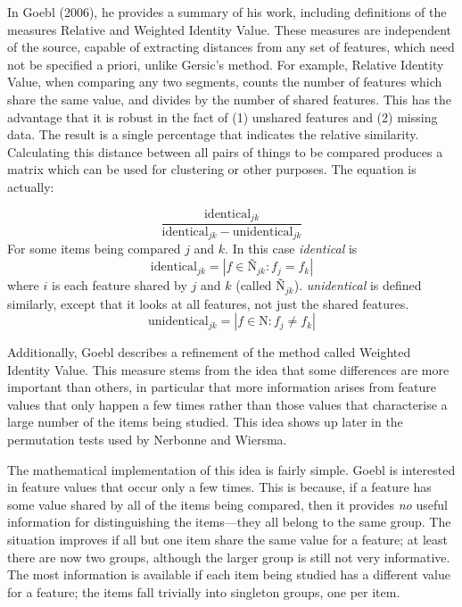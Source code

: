 \documentclass[11pt]{article}
\begin{document}
In Goebl (2006), he provides a summary of his work, including
definitions of the measures Relative and Weighted Identity
Value. These measures are independent of the source, capable of
extracting distances from any set of features, which need not be
specified a priori, unlike Gersic's method. For example, Relative
Identity Value, when comparing any two segments, counts the number of
features which share the same value, and divides by the number of
shared features. This has the advantage that it is robust in the fact
of (1) unshared features and (2) missing data. The result is a single
percentage that indicates the relative similarity. Calculating this
distance between all pairs of things to be compared produces a matrix
which can be used for clustering or other purposes. The equation is
actually:

\begin{equation}
  \frac{\textrm{identical}_{jk}} {\textrm{identical}_{jk} - \textrm{unidentical}_{jk}}
\label{riv}
\end{equation}
For some items being compared $j$ and $k$. In this case
\textit{identical} is
\begin{equation}
  \textrm{identical}_{jk} = |f \in \textrm{\~N}_{jk} : f_j = f_k|
\end{equation}
where $i$ is each feature shared by $j$ and $k$ (called
$\textrm{\~N}_{jk}$). \textit{unidentical} is defined similarly, except
that it looks at all features, not just the shared features.
\begin{equation}
  \textrm{unidentical}_{jk} = |f \in \textrm{N} : f_j \neq f_k|
\end{equation}

Additionally, Goebl
describes a refinement of the method called Weighted Identity
Value. This measure stems from the idea that some differences are
more important than others, in particular that more information arises
from feature values that only happen a few times rather than those
values that characterise a large number of the items being studied.
This idea shows up later in the permutation tests used by Nerbonne and Wiersma.

The mathematical implementation of this idea is fairly simple. Goebl
is interested in feature values that occur only a few times. This is
because, if a feature has some value shared by all of the items being
compared, then it provides {\it no} useful information for
distinguishing the items---they all belong to the same group.
The situation improves if all but one item
share the same value for a feature; at least there are now two
groups, although the larger group is still not very informative.
The most information is available if each item being studied
has a different value for a feature; the items fall trivially into
singleton groups, one per item.
\end{document}

